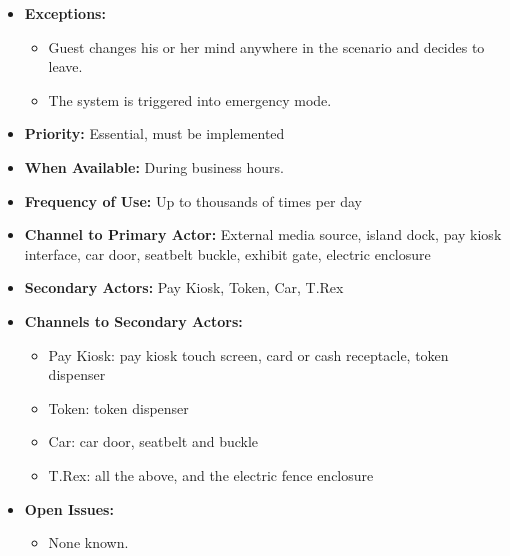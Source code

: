 \documentclass[12pt]{article}
\begin{document}
\begin{itemize}
        \item[]\textbf{Exceptions:}
            \begin{itemize}
                \item[] Guest changes his or her mind anywhere in the scenario and decides to leave.
                \item[] The system is triggered into emergency mode.
            \end{itemize}

        \item[]\textbf{Priority:}
            Essential, must be implemented

        \item[]\textbf{When Available:}
            During business hours.

        \item[]\textbf{Frequency of Use:}
            Up to thousands of times per day
            
        \item[]\textbf{Channel to Primary Actor:}
            External media source, island dock, pay kiosk interface, car door,
            seatbelt buckle, exhibit gate, electric enclosure

        \item[]\textbf{Secondary Actors:}
            Pay Kiosk, Token, Car, T.Rex
            
        \item[]\textbf{Channels to Secondary Actors:}
            \begin{itemize}
                \item[] Pay Kiosk: pay kiosk touch screen, card or cash receptacle, token dispenser
                \item[] Token: token dispenser
                \item[] Car: car door, seatbelt and buckle
                \item[] T.Rex: all the above, and the electric fence enclosure
            \end{itemize}
            
        \item[]\textbf{Open Issues:}
            \begin{itemize}
                \item[] None known.
            \end{itemize}
    \end{itemize}
\end{document}
